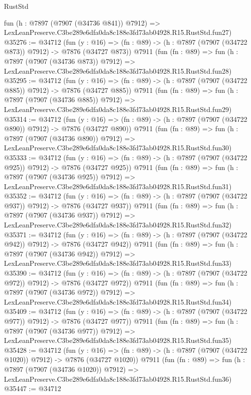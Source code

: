 \begin{lexlean}{RustStd}
\begin{coremodule}
    fun (h : @7897 (@7907 (@34736 @841)) @7912) =>
    LexLeanPreserve.C3be289e6dfa0da8c188e3fd73ab04928.R15.RustStd.fun27)
@35276 := @34712
    (fun (y : @16) => (fn : @89) -> (h : @7897 (@7907 (@34722 @873)) @7912) -> @7876 (@34727 @873))
    @7911
    (fun (fn : @89) =>
    fun (h : @7897 (@7907 (@34736 @873)) @7912) =>
    LexLeanPreserve.C3be289e6dfa0da8c188e3fd73ab04928.R15.RustStd.fun28)
@35295 := @34712
    (fun (y : @16) => (fn : @89) -> (h : @7897 (@7907 (@34722 @885)) @7912) -> @7876 (@34727 @885))
    @7911
    (fun (fn : @89) =>
    fun (h : @7897 (@7907 (@34736 @885)) @7912) =>
    LexLeanPreserve.C3be289e6dfa0da8c188e3fd73ab04928.R15.RustStd.fun29)
@35314 := @34712
    (fun (y : @16) => (fn : @89) -> (h : @7897 (@7907 (@34722 @890)) @7912) -> @7876 (@34727 @890))
    @7911
    (fun (fn : @89) =>
    fun (h : @7897 (@7907 (@34736 @890)) @7912) =>
    LexLeanPreserve.C3be289e6dfa0da8c188e3fd73ab04928.R15.RustStd.fun30)
@35333 := @34712
    (fun (y : @16) => (fn : @89) -> (h : @7897 (@7907 (@34722 @925)) @7912) -> @7876 (@34727 @925))
    @7911
    (fun (fn : @89) =>
    fun (h : @7897 (@7907 (@34736 @925)) @7912) =>
    LexLeanPreserve.C3be289e6dfa0da8c188e3fd73ab04928.R15.RustStd.fun31)
@35352 := @34712
    (fun (y : @16) => (fn : @89) -> (h : @7897 (@7907 (@34722 @937)) @7912) -> @7876 (@34727 @937))
    @7911
    (fun (fn : @89) =>
    fun (h : @7897 (@7907 (@34736 @937)) @7912) =>
    LexLeanPreserve.C3be289e6dfa0da8c188e3fd73ab04928.R15.RustStd.fun32)
@35371 := @34712
    (fun (y : @16) => (fn : @89) -> (h : @7897 (@7907 (@34722 @942)) @7912) -> @7876 (@34727 @942))
    @7911
    (fun (fn : @89) =>
    fun (h : @7897 (@7907 (@34736 @942)) @7912) =>
    LexLeanPreserve.C3be289e6dfa0da8c188e3fd73ab04928.R15.RustStd.fun33)
@35390 := @34712
    (fun (y : @16) => (fn : @89) -> (h : @7897 (@7907 (@34722 @972)) @7912) -> @7876 (@34727 @972))
    @7911
    (fun (fn : @89) =>
    fun (h : @7897 (@7907 (@34736 @972)) @7912) =>
    LexLeanPreserve.C3be289e6dfa0da8c188e3fd73ab04928.R15.RustStd.fun34)
@35409 := @34712
    (fun (y : @16) => (fn : @89) -> (h : @7897 (@7907 (@34722 @977)) @7912) -> @7876 (@34727 @977))
    @7911
    (fun (fn : @89) =>
    fun (h : @7897 (@7907 (@34736 @977)) @7912) =>
    LexLeanPreserve.C3be289e6dfa0da8c188e3fd73ab04928.R15.RustStd.fun35)
@35428 := @34712
    (fun (y : @16) =>
    (fn : @89) -> (h : @7897 (@7907 (@34722 @1020)) @7912) -> @7876 (@34727 @1020))
    @7911
    (fun (fn : @89) =>
    fun (h : @7897 (@7907 (@34736 @1020)) @7912) =>
    LexLeanPreserve.C3be289e6dfa0da8c188e3fd73ab04928.R15.RustStd.fun36)
@35447 := @34712

\end{coremodule}
\end{lexlean}
